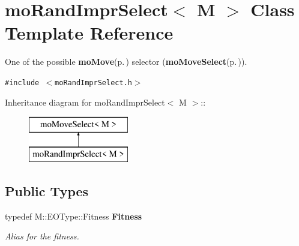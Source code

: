 \section{mo\-Rand\-Impr\-Select$<$ M $>$ Class Template Reference}
\label{classmo_rand_impr_select}
One of the possible {\bf mo\-Move}{\rm (p.\,\pageref{classmo_move})} selector ({\bf mo\-Move\-Select}{\rm (p.\,\pageref{classmo_move_select})}).  


{\tt \#include $<$mo\-Rand\-Impr\-Select.h$>$}

Inheritance diagram for mo\-Rand\-Impr\-Select$<$ M $>$::\begin{figure}[H]
\begin{center}
\leavevmode
\includegraphics[height=2cm]{classmo_rand_impr_select}
\end{center}
\end{figure}
\subsection*{Public Types}
\begin{CompactItemize}
\item 
typedef M::EOType::Fitness {\bf Fitness}\label{classmo_rand_impr_select_3bff2fdb963297430543c82ffb567a5c}

\begin{CompactList}\small\item\em Alias for the fitness. \item\end{CompactList}\end{CompactItemize}
